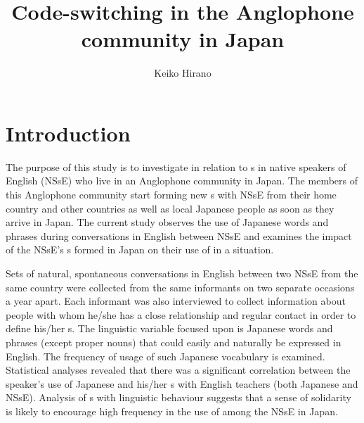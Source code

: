 \documentclass[output=paper]{LSP/langsci}
\author{Keiko Hirano\affiliation{University of Kitakyushu, Japan}}
\title{Code-switching in the {A}nglophone community in {J}apan}
\begin{document}
   

 
\section{Introduction}
The purpose of this study is to investigate  in relation to s in native speakers of English (NSsE) who live in an Anglophone community in Japan. The members of this Anglophone community start forming new s with NSsE from their home country and other countries as well as local Japanese people as soon as they arrive in Japan. The current study observes the use of Japanese words and phrases during conversations in English between NSsE and examines the impact of the NSsE’s s formed in Japan on their use of  in a  situation.

Sets of natural, spontaneous conversations in English between two NSsE from the same country were collected from the same informants on two separate occasions a year apart. Each informant was also interviewed to collect information about people with whom he/she has a close relationship and regular contact in order to define his/her s. The linguistic variable focused upon is Japanese words and phrases (except proper nouns) that could easily and naturally be expressed in English. The frequency of usage of such Japanese vocabulary is examined. Statistical analyses revealed that there was a significant correlation between the speaker’s use of Japanese and his/her s with English teachers (both Japanese and NSsE). Analysis of s with linguistic behaviour suggests that a sense of solidarity is likely to encourage high frequency in the use of  among the NSsE in Japan.
\end{document}
